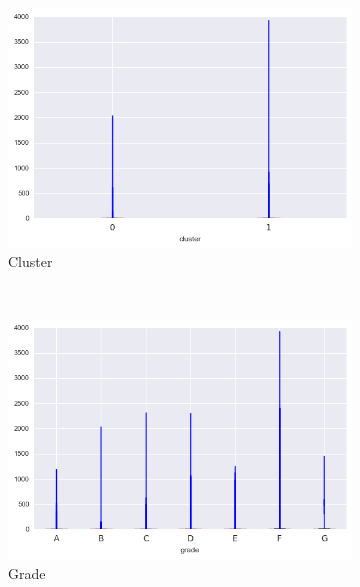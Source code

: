 \begin{anexosenv}
\begin{figure}[t!]
    \centering
        \caption{collection\textunderscore recovery\textunderscore fee }
        \begin{subfigure}[t]{0.5\textwidth}
            \centering
            \caption{Cluster }

            \centerline{\includegraphics[width=1\textwidth]{img/collection_recovery_fee_by_cluster}}
        \end{subfigure}%
        ~ 
        \begin{subfigure}[t]{0.5\textwidth}
            \centering
            \caption{Grade }
   
            \centerline{\includegraphics[width=1\textwidth]{img/collection_recovery_fee_by_grade}}

        \end{subfigure}
        \\
                \caption{funded\textunderscore amnt}
        \begin{subfigure}[t]{0.5\textwidth}
            \centering


\end{subfigure}
\end{figure}
\end{anexosenv}
